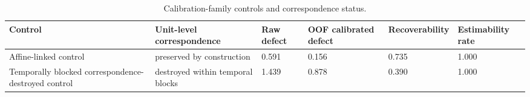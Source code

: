\begin{table}[t]
\caption{Calibration-family controls and correspondence status.}
\label{tab:exp4_calibration_controls}
\begin{tabular}{llllll}
\toprule
Control & Unit-level correspondence & Raw defect & OOF calibrated defect & Recoverability & Estimability rate \\
\midrule
Affine-linked control & preserved by construction & 0.591 & 0.156 & 0.735 & 1.000 \\
Temporally blocked correspondence-destroyed control & destroyed within temporal blocks & 1.439 & 0.878 & 0.390 & 1.000 \\
\bottomrule
\end{tabular}
\end{table}
